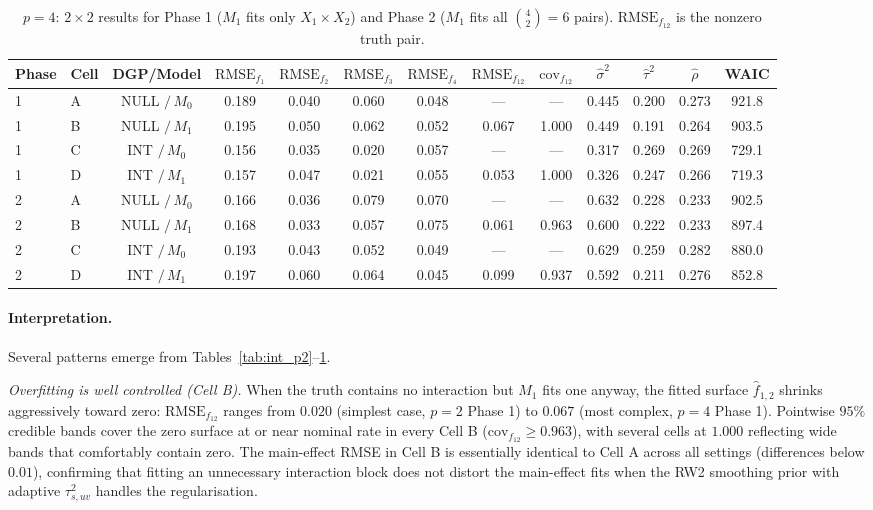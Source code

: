 \begin{table}[!ht]
\centering
\small
\caption{$p=4$: $2\times 2$ results for Phase 1 ($M_1$ fits only $X_1\times X_2$) and
Phase 2 ($M_1$ fits all $\binom{4}{2}=6$ pairs). $\mathrm{RMSE}_{f_{12}}$ is the nonzero
truth pair.}
\label{tab:int_p4}
\begin{tabular}{llccccccccccc}
\toprule
Phase & Cell & DGP/Model & $\mathrm{RMSE}_{f_1}$ & $\mathrm{RMSE}_{f_2}$ & $\mathrm{RMSE}_{f_3}$ &
$\mathrm{RMSE}_{f_4}$ &
$\mathrm{RMSE}_{f_{12}}$ & $\mathrm{cov}_{f_{12}}$ &
$\hat\sigma^2$ & $\hat\tau^2$ & $\hat\rho$ & WAIC \\
\midrule
1 & A & NULL $/\,M_0$ & 0.189 & 0.040 & 0.060 & 0.048 & ---   & ---   & 0.445 & 0.200 & 0.273 & 921.8 \\
1 & B & NULL $/\,M_1$ & 0.195 & 0.050 & 0.062 & 0.052 & 0.067 & 1.000 & 0.449 & 0.191 & 0.264 & 903.5 \\
1 & C & INT $/\,M_0$  & 0.156 & 0.035 & 0.020 & 0.057 & ---   & ---   & 0.317 & 0.269 & 0.269 & 729.1 \\
1 & D & INT $/\,M_1$  & 0.157 & 0.047 & 0.021 & 0.055 & 0.053 & 1.000 & 0.326 & 0.247 & 0.266 & 719.3 \\
\midrule
2 & A & NULL $/\,M_0$ & 0.166 & 0.036 & 0.079 & 0.070 & ---   & ---   & 0.632 & 0.228 & 0.233 & 902.5 \\
2 & B & NULL $/\,M_1$ & 0.168 & 0.033 & 0.057 & 0.075 & 0.061 & 0.963 & 0.600 & 0.222 & 0.233 & 897.4 \\
2 & C & INT $/\,M_0$  & 0.193 & 0.043 & 0.052 & 0.049 & ---   & ---   & 0.629 & 0.259 & 0.282 & 880.0 \\
2 & D & INT $/\,M_1$  & 0.197 & 0.060 & 0.064 & 0.045 & 0.099 & 0.937 & 0.592 & 0.211 & 0.276 & 852.8 \\
\bottomrule
\end{tabular}
\end{table}

\paragraph{Interpretation.}
Several patterns emerge from Tables~\ref{tab:int_p2}--\ref{tab:int_p4}.

\emph{Overfitting is well controlled (Cell B).}
When the truth contains no interaction but $M_1$ fits one anyway, the fitted surface
$\hat f_{1,2}$ shrinks aggressively toward zero: $\mathrm{RMSE}_{f_{12}}$ ranges from
$0.020$ (simplest case, $p=2$ Phase 1) to $0.067$ (most complex, $p=4$ Phase 1). Pointwise
$95\%$ credible bands cover the zero surface at or near nominal rate in every Cell B
($\mathrm{cov}_{f_{12}}\ge 0.963$), with several cells at $1.000$ reflecting wide bands
that comfortably contain zero. The main-effect RMSE in Cell B is essentially identical to
Cell A across all settings (differences below $0.01$), confirming that fitting an
unnecessary interaction block does not distort the main-effect fits when the RW2 smoothing
prior with adaptive $\tau^2_{s,uv}$ handles the regularisation.

